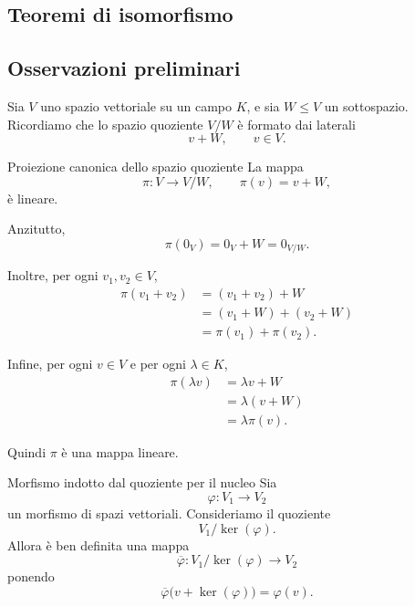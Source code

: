 \documentclass[a4paper]{article}
\begin{document}
\pagebreak

\subsection{Teoremi di isomorfismo}

\subsection{Osservazioni preliminari}

\begin{radioactive}
Sia \(V\) uno spazio vettoriale su un campo \(K\), e sia \(W \leq V\) un sottospazio.
Ricordiamo che lo spazio quoziente \(V/W\) è formato dai laterali
\[
    v+W,
    \qquad
    v \in V.
\]
\end{radioactive}

\begin{radioactive}
\begin{snippetproposition}{Proiezione canonica dello spazio quoziente}
    La mappa
    \[
        \pi \colon V \to V/W,
        \qquad
        \pi(v)=v+W,
    \]
    è lineare.
\end{snippetproposition}
\end{radioactive}

\begin{radioactive}
\begin{snippetproof}{}
    Anzitutto,
    \[
        \pi(0_V)=0_V+W=0_{V/W}.
    \]

    Inoltre, per ogni \(v_1,v_2 \in V\),
    \begin{align*}
        \pi(v_1+v_2)
        &=
        (v_1+v_2)+W \\
        &=
        (v_1+W)+(v_2+W) \\
        &=
        \pi(v_1)+\pi(v_2).
    \end{align*}

    Infine, per ogni \(v \in V\) e per ogni \(\lambda \in K\),
    \begin{align*}
        \pi(\lambda v)
        &=
        \lambda v+W \\
        &=
        \lambda(v+W) \\
        &=
        \lambda \pi(v).
    \end{align*}

    Quindi \(\pi\) è una mappa lineare.
\end{snippetproof}
\end{radioactive}

\begin{radioactive}
\begin{snippetproposition}{Morfismo indotto dal quoziente per il nucleo}
    Sia
    \[
        \varphi \colon V_1 \to V_2
    \]
    un morfismo di spazi vettoriali.
    Consideriamo il quoziente
    \[
        V_1/\ker(\varphi).
    \]
    Allora è ben definita una mappa
    \[
        \overline{\varphi}
        \colon
        V_1/\ker(\varphi)
        \to
        V_2
    \]
    ponendo
    \[
        \overline{\varphi}\big(v+\ker(\varphi)\big)=\varphi(v).
    \]
\end{snippetproposition}
\end{radioactive}
\end{document}
